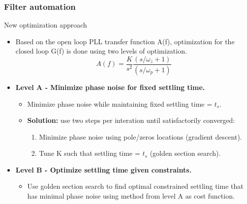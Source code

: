 \documentclass[t, screen, aspectratio=43]{beamer}
\begin{document}
\begin{frame}
	\frametitle{Filter automation}
	\begin{block}{New optimization approach}
		\begin{itemize}
			\scriptsize
			\item Based on the open loop PLL transfer function A(f), optimization for the closed loop G(f) is done using two levels of optimization.
			\begin{equation}
				A(f) = \frac{K}{s^2}\frac{(s/\omega_z +1)}{(s/\omega_p +1)}
			\end{equation}
			\item \textbf{Level A - Minimize phase noise for fixed settling time.}
			\begin{itemize}
				\scriptsize
				\item Minimize phase noise while maintaining fixed settling time = $t_s$.
				\item \textbf{Solution:} use two steps per interation until satisfactorily converged:
				\begin{enumerate}
					\scriptsize
					\item Minimize phase noise using pole/zeros locations (gradient descent).
					\item Tune K such that settling time = $t_s$ (golden section search).
				\end{enumerate}

			\end{itemize}
		\item \textbf{Level B - Optimize settling time given constraints.}
		\begin{itemize}
			\scriptsize
			\item Use golden section search to find optimal constrained settling time that has minimal phase noise using method from level A as cost function.
		\end{itemize} 
		\end{itemize}    
	\end{block}
\end{frame}
\end{document}

